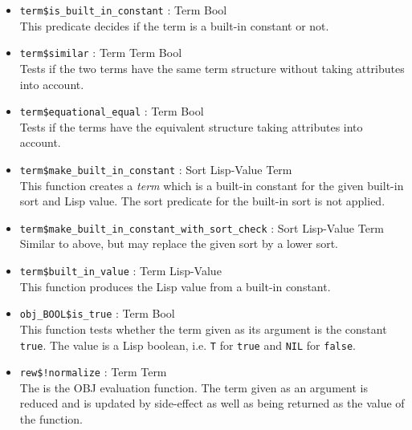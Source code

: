 \begin{itemize}
\vspace{1ex}
\item {\tt term\$is\_built\_in\_constant} : Term \ra Bool\\
This predicate decides if the term is a built-in constant or not.
\item {\tt term\$similar} : Term Term \ra Bool\\
Tests if the two terms have the same term structure without taking
attributes into account.
\item {\tt term\$equational\_equal} : Term \ra Bool\\
Tests if the terms have the equivalent structure taking attributes
into account.
\item {\tt term\$make\_built\_in\_constant} : Sort Lisp-Value \ra Term\\
This function creates a {\em term} which is a built-in constant
for the given built-in sort and Lisp value.  The sort predicate for
the built-in sort is not applied.
\item {\tt term\$make\_built\_in\_constant\_with\_sort\_check} : Sort Lisp-Value \ra Term\\
Similar to above, but may replace the given sort by a lower sort.
\item {\tt term\$built\_in\_value} : Term \ra Lisp-Value\\
This function produces the Lisp value from a built-in constant.
\item {\tt obj\_BOOL\$is\_true} : Term \ra Bool\\
This function tests whether the term given as its argument is the
constant {\tt true}.  The value is a Lisp boolean, i.e. {\tt T} for
{\tt true} and {\tt NIL} for {\tt false}.
\item {\tt rew\$!normalize} : Term \ra Term\\
The is the OBJ evaluation function.  The term given as an argument
is reduced and is updated by side-effect as well as being returned
as the value of the function.
\end{itemize}

